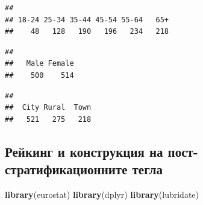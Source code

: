 \documentclass[
]{article}
\newenvironment{Shaded}{\begin{snugshade}}{\end{snugshade}}
\newcommand{\CommentTok}[1]{\textcolor[rgb]{0.56,0.35,0.01}{\textit{#1}}}
\newcommand{\FunctionTok}[1]{\textcolor[rgb]{0.13,0.29,0.53}{\textbf{#1}}}
\newcommand{\NormalTok}[1]{#1}
\newcommand{\SpecialCharTok}[1]{\textcolor[rgb]{0.81,0.36,0.00}{\textbf{#1}}}
\begin{document}
\begin{Shaded}
\end{Shaded}

\begin{verbatim}
## 
## 18-24 25-34 35-44 45-54 55-64   65+ 
##    48   128   190   196   234   218
\end{verbatim}

\begin{Shaded}
\end{Shaded}

\begin{verbatim}
## 
##   Male Female 
##    500    514
\end{verbatim}

\begin{Shaded}
\end{Shaded}

\begin{verbatim}
## 
##  City Rural  Town 
##   521   275   218
\end{verbatim}

\subsection{Рейкинг и конструкция на пост-стратификационните
тегла}\label{ux440ux435ux439ux43aux438ux43dux433-ux438-ux43aux43eux43dux441ux442ux440ux443ux43aux446ux438ux44f-ux43dux430-ux43fux43eux441ux442-ux441ux442ux440ux430ux442ux438ux444ux438ux43aux430ux446ux438ux43eux43dux43dux438ux442ux435-ux442ux435ux433ux43bux430}

\begin{Shaded}
\begin{Highlighting}[]
\FunctionTok{library}\NormalTok{(eurostat)}
\FunctionTok{library}\NormalTok{(dplyr)}
\FunctionTok{library}\NormalTok{(lubridate)}
\end{Highlighting}
\end{Shaded}
\end{document}
